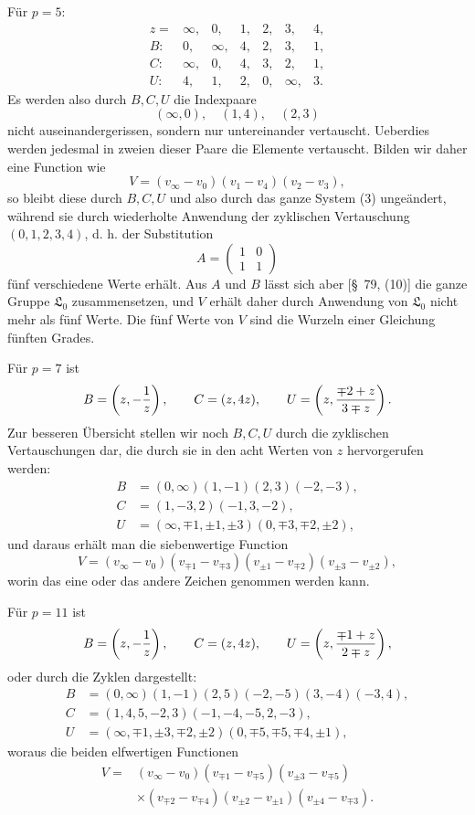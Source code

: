 \documentclass[11pt]{article}
\providecommand{\Lzero}{\mathfrak L_0}
\begin{document}
Für $p=5$:
\[
\begin{array}{rrrrrrr}
z=&\infty,&0,&1,&2,&3,&4,\\
B:&0,&\infty,&4,&2,&3,&1,\\
C:&\infty,&0,&4,&3,&2,&1,\\
U:&4,&1,&2,&0,&\infty,&3.
\end{array}
\]
Es werden also durch $B,C,U$ die Indexpaare
\[
 (\infty,0),\quad(1,4),\quad(2,3)
\]
nicht auseinandergerissen, sondern nur untereinander vertauscht. Ueberdies werden jedesmal in zweien dieser Paare die Elemente vertauscht. Bilden wir daher eine Function wie
\begin{equation}
 V=(v_\infty-v_0)(v_1-v_4)(v_2-v_3),
\tag{9}
\end{equation}
so bleibt diese durch $B,C,U$ und also durch das ganze System (3) ungeändert, während sie durch wiederholte Anwendung der zyklischen Vertauschung $(0,1,2,3,4)$, d. h. der Substitution
\[
 A=\begin{pmatrix}1&0\\1&1\end{pmatrix}
\]
fünf verschiedene Werte erhält. Aus $A$ und $B$ lässt sich aber [\S~79, (10)] die ganze Gruppe $\Lzero$ zusammensetzen, und $V$ erhält daher durch Anwendung von $\Lzero$ nicht mehr als fünf Werte. Die fünf Werte von $V$ sind die Wurzeln einer Gleichung fünften Grades.

Für $p=7$ ist
\[
 B=\left(z,-{1\over z}\right),\qquad C=(z,4z),\qquad
 U=\left(z,{\mp2+z\over 3\mp z}\right).
\]
Zur besseren Übersicht stellen wir noch $B,C,U$ durch die zyklischen Vertauschungen dar, die durch sie in den acht Werten von $z$ hervorgerufen werden:
\[
\begin{aligned}
B&=(0,\infty)(1,-1)(2,3)(-2,-3),\\
C&=(1,-3,2)(-1,3,-2),\\
U&=(\infty,\mp1,\pm1,\pm3)(0,\mp3,\mp2,\pm2),
\end{aligned}
\]
und daraus erhält man die siebenwertige Function
\begin{equation}
 V=(v_\infty-v_0)(v_{\mp1}-v_{\mp3})(v_{\pm1}-v_{\mp2})(v_{\pm3}-v_{\pm2}),
\tag{10}
\end{equation}
worin das eine oder das andere Zeichen genommen werden kann.

Für $p=11$ ist
\[
 B=\left(z,-{1\over z}\right),\qquad C=(z,4z),\qquad
 U=\left(z,{\mp1+z\over 2\mp z}\right),
\]
oder durch die Zyklen dargestellt:
\[
\begin{aligned}
B&=(0,\infty)(1,-1)(2,5)(-2,-5)(3,-4)(-3,4),\\
C&=(1,4,5,-2,3)(-1,-4,-5,2,-3),\\
U&=(\infty,\mp1,\pm3,\mp2,\pm2)(0,\mp5,\mp5,\mp4,\pm1),
\end{aligned}
\]
woraus die beiden elfwertigen Functionen
\begin{equation}
\begin{aligned}
 V={}&(v_\infty-v_0)(v_{\mp1}-v_{\mp5})(v_{\pm3}-v_{\mp5})\\
 &\times(v_{\mp2}-v_{\mp4})(v_{\pm2}-v_{\pm1})(v_{\pm4}-v_{\mp3}).
\end{aligned}
\tag{11}
\end{equation}
\end{document}

